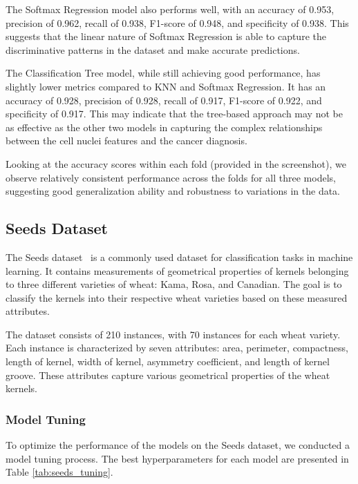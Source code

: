 \documentclass[letterpaper,10pt]{article}
\begin{document}
The Softmax Regression model also performs well, with an accuracy of 0.953, precision of 0.962, recall of 0.938, F1-score of 0.948, and specificity of 0.938. This suggests that the linear nature of Softmax Regression is able to capture the discriminative patterns in the dataset and make accurate predictions.

The Classification Tree model, while still achieving good performance, has slightly lower metrics compared to KNN and Softmax Regression. It has an accuracy of 0.928, precision of 0.928, recall of 0.917, F1-score of 0.922, and specificity of 0.917. This may indicate that the tree-based approach may not be as effective as the other two models in capturing the complex relationships between the cell nuclei features and the cancer diagnosis.

Looking at the accuracy scores within each fold (provided in the screenshot), we observe relatively consistent performance across the folds for all three models, suggesting good generalization ability and robustness to variations in the data.

\subsection{Seeds Dataset}

The Seeds dataset~\cite{misc_seeds_236} is a commonly used dataset for classification tasks in machine learning. It contains measurements of geometrical properties of kernels belonging to three different varieties of wheat: Kama, Rosa, and Canadian. The goal is to classify the kernels into their respective wheat varieties based on these measured attributes.

The dataset consists of 210 instances, with 70 instances for each wheat variety. Each instance is characterized by seven attributes: area, perimeter, compactness, length of kernel, width of kernel, asymmetry coefficient, and length of kernel groove. These attributes capture various geometrical properties of the wheat kernels.

\subsubsection{Model Tuning}

To optimize the performance of the models on the Seeds dataset, we conducted a model tuning process. The best hyperparameters for each model are presented in Table \ref{tab:seeds_tuning}.
\end{document}
